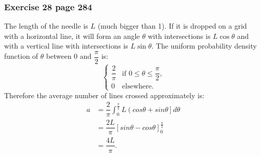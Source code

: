\documentclass[10pt,leter,openany]{article}
\begin{document}
	\subsubsection*{Exercise 28 page 284}
	
The length of the needle is $ L $ (much bigger than 1). If it is dropped on a grid with a horizontal line, it will form an angle $\theta$ with intersections is $L\cos \theta $ and with a vertical line with intersections is $L\sin \theta $. The uniform probability density function of $\theta$ between $0$ and $\dfrac{\pi}{2} $ is:
$$ \begin{cases}
	\dfrac{2}{\pi}
	& \mbox{if $0\leq \theta \leq  \dfrac{\pi}{2}$,}\\
	0 & \mbox{elsewhere.} \end{cases}
$$
Therefore the average number of lines crossed approximately is:
\begin{equation*}
	\begin{aligned}
	a &	= \dfrac{2}{\pi} \int_{0}^{\frac{\pi}{2}} L \left( cos\theta + sin\theta\right] d\theta \\
	 &	= \dfrac{2L}{\pi} \left[ sin\theta - cos\theta\right]_{0}^{\frac{\pi}{2}} \\
	 &	= \dfrac{4L}{\pi}. \\
	\end{aligned}	
\end{equation*}
		
\clearpage

	
	
	
\end{document}
